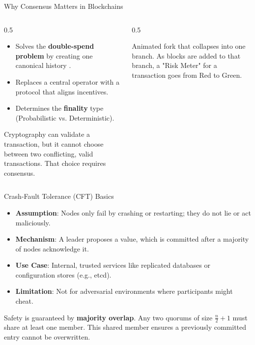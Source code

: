\documentclass[aspectratio=169]{beamer}
\newcommand{\placeholdergraphic}[2][\linewidth]{%
  \begin{tcolorbox}[
    enhanced, colback=white, colframe=usmagray,
    title=Graphic placeholder, width=#1, sharp corners,
    boxrule=0.5pt, left=4pt,right=4pt,top=6pt,bottom=6pt
  ]
    \footnotesize #2
  \end{tcolorbox}
}
\begin{document}
\begin{frame}{Why Consensus Matters in Blockchains}
    \begin{columns}[T]
        \begin{column}{0.5\linewidth}
            \begin{itemize}
                \item Solves the \textbf{double-spend problem} by creating one canonical history \cite{nakamoto_bitcoin_2008}.
                \item Replaces a central operator with a protocol that aligns incentives.
                \item Determines the \textbf{finality} type (Probabilistic vs. Deterministic).
            \end{itemize}
            \begin{tcolorbox}[enhanced, colback=red!20, colframe=red!75!black, fonttitle=\bfseries, title={The Core Problem}, rounded corners, drop shadow, height=5cm]
            Cryptography can validate a transaction, but it cannot choose between two conflicting, valid transactions. That choice requires consensus.
            \end{tcolorbox}
        \end{column}
        \begin{column}{0.5\linewidth}
            \placeholdergraphic{Animated fork that collapses into one branch. As blocks are added to that branch, a "Risk Meter" for a transaction goes from Red to Green.}
        \end{column}
    \end{columns}
\end{frame}

\begin{frame}{Crash-Fault Tolerance (CFT) Basics}
    \begin{itemize}
        \item \textbf{Assumption}: Nodes only fail by crashing or restarting; they do not lie or act maliciously.
        \item \textbf{Mechanism}: A leader proposes a value, which is committed after a majority of nodes acknowledge it.
        \item \textbf{Use Case}: Internal, trusted services like replicated databases or configuration stores (e.g., etcd).
        \item \textbf{Limitation}: Not for adversarial environments where participants might cheat.
    \end{itemize}
    \vfill
    \begin{tcolorbox}[colback=white, colframe=usmagray, title={How CFT Achieves Safety}]
        Safety is guaranteed by \textbf{majority overlap}. Any two quorums of size $\frac{n}{2}+1$ must share at least one member. This shared member ensures a previously committed entry cannot be overwritten.
    \end{tcolorbox}
\end{frame}
\end{document}
